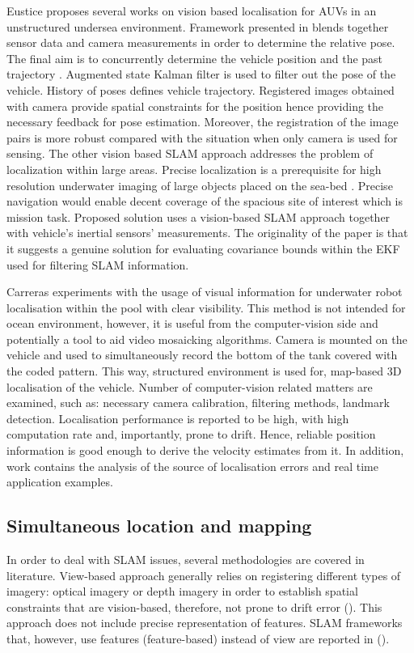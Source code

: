 Eustice proposes several works on vision based localisation for AUVs in an unstructured undersea environment. Framework presented in \cite{eustice04} blends together sensor data and camera measurements in order to determine the relative pose. The final aim is to concurrently determine the vehicle position and the past trajectory \cite{eustice04}. Augmented state Kalman filter is used to filter out the pose of the vehicle. History of poses defines vehicle trajectory. Registered images obtained with camera provide spatial constraints for the position hence providing the necessary feedback for pose estimation. Moreover, the registration of the image pairs is more robust compared with the situation when only camera is used for sensing. The other vision based SLAM approach \cite{eustice05} addresses the problem of localization within large areas. Precise localization is a prerequisite for high resolution underwater imaging of large objects placed on the sea-bed \cite{eustice05}. Precise navigation would enable decent coverage of the spacious site of interest which is mission task. Proposed solution uses a vision-based SLAM approach together with vehicle's inertial sensors' measurements. The originality of the paper is that it suggests a genuine solution for evaluating covariance bounds within the EKF used for filtering SLAM information. 

Carreras \cite{carreras03} experiments with the usage of visual information for underwater robot localisation within the pool with clear visibility. This method is not intended for ocean environment, however, it is useful from the computer-vision side and potentially a tool to aid video mosaicking algorithms. Camera is mounted on the vehicle and used to simultaneously record the bottom of the tank covered with the coded pattern. This way, structured environment is used for, map-based 3D localisation of the vehicle. Number of computer-vision related matters are examined, such as: necessary camera calibration, filtering methods, landmark detection. Localisation performance is reported to be high, with high computation rate and, importantly, prone to drift. Hence, reliable position information is good enough to derive the velocity estimates from it. In addition, work contains the analysis of the source of localisation errors and real time application examples.  
\subsection{Simultaneous location and mapping}
In order to deal with SLAM issues, several methodologies are covered in literature. View-based approach generally relies on registering different types of imagery: optical imagery or depth imagery in order to establish spatial constraints that are vision-based, therefore, not prone to drift error (\cite{garcia01, eustice05towards, roman05}). This approach does not include precise representation of features. SLAM frameworks that, however, use features (feature-based) instead of view are reported in (\cite{williams04, ruiz01}).
